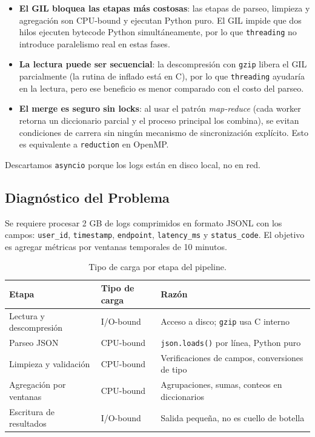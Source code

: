 \documentclass[10pt,a4paper]{article}
\begin{document}
\begin{itemize}
    \item \textbf{El GIL bloquea las etapas m\'as costosas}: las etapas de
        parseo, limpieza y agregaci\'on son CPU-bound y ejecutan Python puro.
        El GIL impide que dos hilos ejecuten bytecode Python simult\'aneamente,
        por lo que \texttt{threading} no introduce paralelismo real en estas
        fases.
    \item \textbf{La lectura puede ser secuencial}: la descompresi\'on con
        \texttt{gzip} libera el GIL parcialmente (la rutina de inflado est\'a
        en C), por lo que \texttt{threading} ayudar\'ia en la lectura, pero
        ese beneficio es menor comparado con el costo del parseo.
    \item \textbf{El merge es seguro sin locks}: al usar el patr\'on
        \emph{map-reduce} (cada worker retorna un diccionario parcial y el
        proceso principal los combina), se evitan condiciones de carrera sin
        ning\'un mecanismo de sincronizaci\'on expl\'icito. Esto es equivalente
        a \texttt{reduction} en OpenMP.
\end{itemize}

Descartamos \texttt{asyncio} porque los logs est\'an en disco local, no en red.

\subsection{Diagn\'ostico del Problema}

Se requiere procesar 2 GB de logs comprimidos en formato JSONL con los campos:
\texttt{user\_id}, \texttt{timestamp}, \texttt{endpoint}, \texttt{latency\_ms}
y \texttt{status\_code}. El objetivo es agregar m\'etricas por ventanas
temporales de 10 minutos.

\begin{table}[H]
\centering
\begin{tabular}{lll}
\toprule
\textbf{Etapa} & \textbf{Tipo de carga} & \textbf{Raz\'on} \\
\midrule
Lectura y descompresi\'on & I/O-bound & Acceso a disco; \texttt{gzip} usa C interno \\
Parseo JSON              & CPU-bound & \texttt{json.loads()} por l\'inea, Python puro \\
Limpieza y validaci\'on  & CPU-bound & Verificaciones de campos, conversiones de tipo \\
Agregaci\'on por ventanas & CPU-bound & Agrupaciones, sumas, conteos en diccionarios \\
Escritura de resultados  & I/O-bound & Salida peque\~na, no es cuello de botella \\
\bottomrule
\end{tabular}
\caption{Tipo de carga por etapa del pipeline.}
\end{table}
\end{document}

